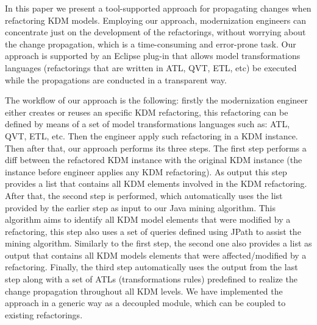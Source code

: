 In this paper we present a tool-supported approach for propagating changes when refactoring KDM models. Employing our approach, modernization engineers can concentrate just on the development of the refactorings, without worrying about the change propagation, which is a time-consuming and error-prone task. Our approach is supported by an Eclipse plug-in that allows model transformations languages (refactorings that are written in ATL, QVT, ETL, etc) be executed while the propagations are conducted in a transparent way.


The workflow of our approach is the following: firstly the modernization engineer either creates or reuses an specific KDM refactoring, this refactoring can be defined by means of a set of model transformations languages such as: ATL, QVT, ETL, etc. Then the engineer apply such refactoring in a KDM instance. Then after that, our approach performs its three steps. The first step performs a diff between the refactored KDM instance with the original KDM instance (the instance before engineer applies any KDM refactoring). As output this step provides a list that contains all KDM elements involved in the KDM refactoring. After that, the second step is performed, which automatically uses the list provided by the earlier step as input to our Java mining algorithm. This algorithm aims to identify all KDM model elements that were modified by a refactoring, this step also uses a set of queries defined using JPath to assist the mining algorithm. Similarly to the first step, the second one also provides a list as output that contains all KDM models elements that were affected/modified by a refactoring. Finally, the third step automatically uses the output from the last step along with a set of ATLs (transformations rules) predefined to realize the change propagation throughout all KDM levels. We have implemented the approach in a generic way as a decoupled module, which can be coupled to existing refactorings. 



